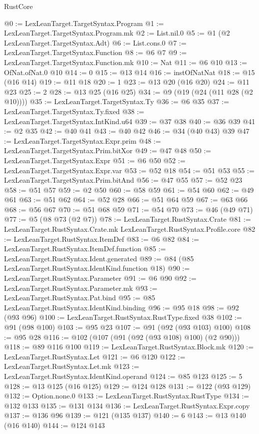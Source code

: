 \begin{lexlean}{RustCore}
\begin{coremodule}
@0 := LexLeanTarget.TargetSyntax.Program
@1 := LexLeanTarget.TargetSyntax.Program.mk
@2 := List.nil.{0}
@5 := @1 (@2 LexLeanTarget.TargetSyntax.Adt)
@6 := List.cons.{0}
@7 := LexLeanTarget.TargetSyntax.Function
@8 := @6 @7
@9 := LexLeanTarget.TargetSyntax.Function.mk
@10 := Nat
@11 := @6 @10
@13 := OfNat.ofNat.{0} @10
@14 := 0
@15 := @13 @14
@16 := instOfNatNat
@18 := @15 (@16 @14)
@19 := @11 @18
@20 := 1
@23 := @13 @20 (@16 @20)
@24 := @11 @23
@25 := 2
@28 := @13 @25 (@16 @25)
@34 := @9 (@19 (@24 (@11 @28 (@2 @10))))
@35 := LexLeanTarget.TargetSyntax.Ty
@36 := @6 @35
@37 := LexLeanTarget.TargetSyntax.Ty.fixed
@38 := LexLeanTarget.TargetSyntax.IntKind.u64
@39 := @37 @38
@40 := @36 @39
@41 := @2 @35
@42 := @40 @41
@43 := @40 @42
@46 := @34 (@40 @43) @39
@47 := LexLeanTarget.TargetSyntax.Expr.prim
@48 := LexLeanTarget.TargetSyntax.Prim.bitXor
@49 := @47 @48
@50 := LexLeanTarget.TargetSyntax.Expr
@51 := @6 @50
@52 := LexLeanTarget.TargetSyntax.Expr.var
@53 := @52 @18
@54 := @51 @53
@55 := LexLeanTarget.TargetSyntax.Prim.bitAnd
@56 := @47 @55
@57 := @52 @23
@58 := @51 @57
@59 := @2 @50
@60 := @58 @59
@61 := @54 @60
@62 := @49 @61
@63 := @51 @62
@64 := @52 @28
@66 := @51 @64 @59
@67 := @63 @66
@68 := @56 @67
@70 := @51 @68 @59
@71 := @54 @70
@73 := @46 (@49 @71)
@77 := @5 (@8 @73 (@2 @7))
@78 := LexLeanTarget.RustSyntax.Crate
@81 := LexLeanTarget.RustSyntax.Crate.mk LexLeanTarget.RustSyntax.Profile.core
@82 := LexLeanTarget.RustSyntax.ItemDef
@83 := @6 @82
@84 := LexLeanTarget.RustSyntax.ItemDef.function
@85 := LexLeanTarget.RustSyntax.Ident.generated
@89 := @84 (@85 LexLeanTarget.RustSyntax.IdentKind.function @18)
@90 := LexLeanTarget.RustSyntax.Parameter
@91 := @6 @90
@92 := LexLeanTarget.RustSyntax.Parameter.mk
@93 := LexLeanTarget.RustSyntax.Pat.bind
@95 := @85 LexLeanTarget.RustSyntax.IdentKind.binding
@96 := @95 @18
@98 := @92 (@93 @96)
@100 := LexLeanTarget.RustSyntax.RustType.fixed @38
@102 := @91 (@98 @100)
@103 := @95 @23
@107 := @91 (@92 (@93 @103) @100)
@108 := @95 @28
@116 := @102 (@107 (@91 (@92 (@93 @108) @100) (@2 @90)))
@118 := @89 @116 @100
@119 := LexLeanTarget.RustSyntax.Block.mk
@120 := LexLeanTarget.RustSyntax.Let
@121 := @6 @120
@122 := LexLeanTarget.RustSyntax.Let.mk
@123 := LexLeanTarget.RustSyntax.IdentKind.operand
@124 := @85 @123
@125 := 5
@128 := @13 @125 (@16 @125)
@129 := @124 @128
@131 := @122 (@93 @129)
@132 := Option.none.{0}
@133 := LexLeanTarget.RustSyntax.RustType
@134 := @132 @133
@135 := @131 @134
@136 := LexLeanTarget.RustSyntax.Expr.copy
@137 := @136 @96
@139 := @121 (@135 @137)
@140 := 6
@143 := @13 @140 (@16 @140)
@144 := @124 @143

\end{coremodule}
\end{lexlean}
